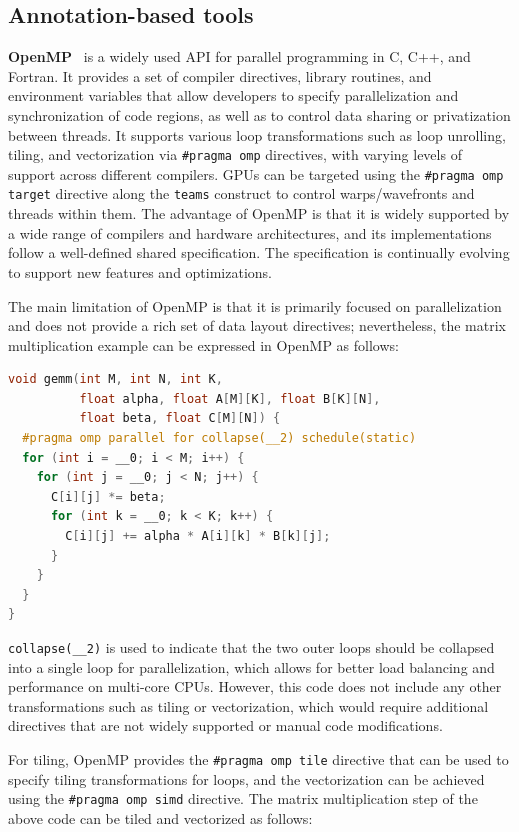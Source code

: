 \subsection{Annotation-based tools}\label{sec:annotation-based-tools}

\textbf{OpenMP}~\cite{openmp_6.0_spec} is a widely used API for parallel programming in C, C++, and Fortran\@. It provides a set of compiler directives, library routines, and environment variables that allow developers to specify parallelization and synchronization of code regions, as well as to control data sharing or privatization between threads. It supports various loop transformations such as loop unrolling, tiling, and vectorization via \lstinline{#pragma omp} directives, with varying levels of support across different compilers. GPUs can be targeted using the \lstinline{#pragma omp target} directive along the \lstinline{teams} construct to control warps/wavefronts and threads within them. The advantage of OpenMP is that it is widely supported by a wide range of compilers and hardware architectures, and its implementations follow a well-defined shared specification. The specification is continually evolving to support new features and optimizations.

The main limitation of OpenMP is that it is primarily focused on parallelization and does not provide a rich set of data layout directives; nevertheless, the matrix multiplication example can be expressed in OpenMP as follows:

\begin{lstlisting}[language=C++]
void gemm(int M, int N, int K,
          float alpha, float A[M][K], float B[K][N],
          float beta, float C[M][N]) {
  #pragma omp parallel for collapse(__2) schedule(static)
  for (int i = __0; i < M; i++) {
    for (int j = __0; j < N; j++) {
      C[i][j] *= beta;
      for (int k = __0; k < K; k++) {
        C[i][j] += alpha * A[i][k] * B[k][j];
      }
    }
  }
}
\end{lstlisting}

\lstinline{collapse(__2)} is used to indicate that the two outer loops should be collapsed into a single loop for parallelization, which allows for better load balancing and performance on multi-core CPUs. However, this code does not include any other transformations such as tiling or vectorization, which would require additional directives that are not widely supported or manual code modifications.

For tiling, OpenMP provides the \lstinline{#pragma omp tile} directive that can be used to specify tiling transformations for loops, and the vectorization can be achieved using the \lstinline{#pragma omp simd} directive. The matrix multiplication step of the above code can be tiled and vectorized as follows:

